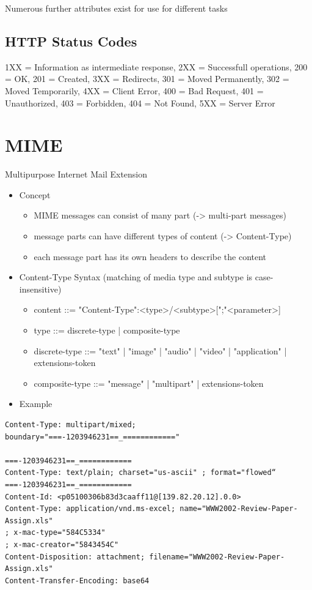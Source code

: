 \documentclass[11pt]{article}
\begin{document}
Numerous further attributes exist for use for different tasks

\subsection{HTTP Status Codes}
\label{sec:org2895285}
1XX = Information as intermediate response, 2XX = Successfull operations, 200 = OK, 201 = Created, 3XX = Redirects, 301 = Moved Permanently, 302 = Moved Temporarily, 4XX = Client Error, 400 = Bad Request, 401 = Unauthorized, 403 = Forbidden, 404 = Not Found, 5XX = Server Error
\section{MIME}
\label{sec:org8116549}
Multipurpose Internet Mail Extension
\begin{itemize}
\item Concept
\begin{itemize}
\item MIME messages can consist of many part (-> multi-part messages)
\item message parts can have different types of content (-> Content-Type)
\item each message part has its own headers to describe the content
\end{itemize}
\item Content-Type Syntax (matching of media type and subtype is case-insensitive)
\begin{itemize}
\item content ::= "Content-Type":<type>/<subtype>[";"<parameter>]
\item type ::= discrete-type | composite-type
\item discrete-type ::= "text" | "image" | "audio" | "video" | "application" | extensions-token
\item composite-type ::= "message" | "multipart" | extensions-token
\end{itemize}
\item Example
\end{itemize}
\lstset{breaklines=true,language=sh,label= ,caption= ,captionpos=b,numbers=none}
\begin{lstlisting}
Content-Type: multipart/mixed; boundary="===-1203946231==_============"

===-1203946231==_============
Content-Type: text/plain; charset="us-ascii" ; format="flowed“
===-1203946231==_============
Content-Id: <p05100306b83d3caaff11@[139.82.20.12].0.0>
Content-Type: application/vnd.ms-excel; name="WWW2002-Review-Paper-Assign.xls"
; x-mac-type="584C5334"
; x-mac-creator="5843454C"
Content-Disposition: attachment; filename="WWW2002-Review-Paper-Assign.xls"
Content-Transfer-Encoding: base64
\end{lstlisting}
\end{document}
